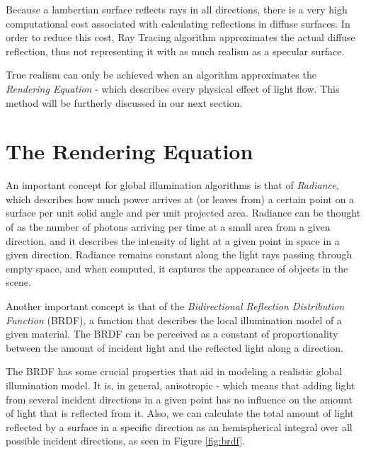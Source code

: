 
Because a lambertian surface reflects rays in all directions, there is a very high computational cost associated with calculating reflections in diffuse surfaces. In order to reduce this cost, Ray Tracing algorithm approximates the actual diffuse reflection, thus not representing it with as much realism as a specular surface.

True realism can only be achieved when an algorithm approximates the \textit{Rendering Equation} - which describes every physical effect of light flow. This method will be furtherly discussed in our next section. 

\section{The Rendering Equation}

An important concept for global illumination algorithms is that of \textit{Radiance}, which describes how much power arrives at (or leaves from) a certain point on a surface per unit solid angle and per unit projected area. Radiance can be thought of as the number of photons arriving per time at a small area from a given direction, and it describes the intensity of light at a given point in space in a given direction. Radiance remains constant along the light rays passing through empty space, and when computed, it captures the appearance of objects in the scene.

Another important concept is that of the \textit{Bidirectional Reflection Distribution Function} (BRDF), a function that describes the local illumination model of a given material. The BRDF can be perceived as a constant of proportionality between the amount of incident light and the reflected light along a direction. 

The BRDF has some crucial properties that aid in modeling a realistic global illumination model. It is, in general, anisotropic - which means that adding light from several incident directions in a given point has no influence on the amount of light that is reflected from it. Also, we can calculate the total amount of light reflected by a surface in a specific direction as an hemispherical integral over all possible incident directions, as seen in Figure \ref{fig:brdf}.

